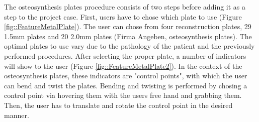 The osteosynthesis plates procedure consists of two steps before adding it as a step to the project case.
First, users have to chose which plate to use (Figure \ref{fig::FeatureMetalPlate}).
The user can chose from four reconstruction plates, 29 1.5mm plates and 20 2.0mm plates (Firma Angeben, osteosynthesis plates).
The optimal plates to use vary due to the pathology of the patient and the previously performed procedures.
After selecting the proper plate, a number of indicators will show to the user (Figure \ref{fig::FeatureMetalPlate2}).
In the context of the osteosynthesis plates, these indicators are "control points", with which the user can bend and twist the plates.
Bending and twisting is performed by chosing a control point via hovering them with the users free hand and grabbing them.
Then, the user has to translate and rotate the control point in the desired manner.
